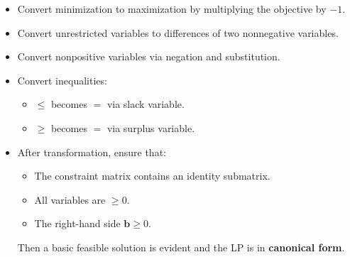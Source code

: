\begin{itemize}
    \item Convert minimization to maximization by multiplying the objective by \( -1 \).
    \item Convert unrestricted variables to differences of two nonnegative variables.
    \item Convert nonpositive variables via negation and substitution.
    \item Convert inequalities:
    \begin{itemize}
        \item \( \leq \) becomes \( = \) via slack variable.
        \item \( \geq \) becomes \( = \) via surplus variable.
    \end{itemize}
    \item After transformation, ensure that:
    \begin{itemize}
        \item The constraint matrix contains an identity submatrix.
        \item All variables are \( \geq 0 \).
        \item The right-hand side \( \mathbf{b} \geq 0 \).
    \end{itemize}
    Then a basic feasible solution is evident and the LP is in \textbf{canonical form}.
\end{itemize}


